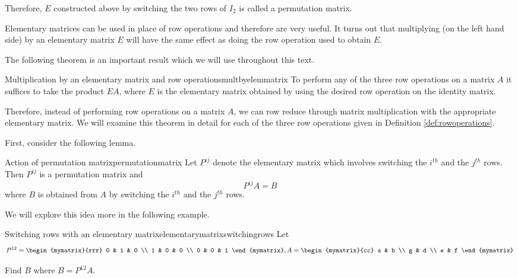 Therefore, $E$ constructed above by switching the two rows of $I_2$ is called a permutation matrix. 

Elementary matrices can be used in place of row operations and therefore are very useful. It turns
out that multiplying (on the left hand side) by an elementary matrix $E$ will have the
same effect as doing the row operation used to obtain $E$.

The following theorem is an important result which we will use throughout this text. 

\begin{theorem}{Multiplication by an elementary matrix and row operations}{multbyelemmatrix}
To perform any of the three row operations on a matrix $A$
it suffices to take the product $EA$, where $E$ is the elementary matrix obtained by 
using the desired row operation on the identity matrix.
\end{theorem}

Therefore, instead of performing row operations on a matrix $A$, we
can row reduce through matrix multiplication with the appropriate
elementary matrix. We will examine this theorem in detail for each of
the three row operations given in Definition \ref{def:rowoperations}.

First, consider the following lemma.

\begin{lemma}{Action of permutation matrix}{permutationmatrix}
Let $P^{ij}$ denote the elementary matrix which involves
switching the $i^{th}$ and the $j^{th}$ rows. Then $P^{ij}$ is a permutation matrix and 
\begin{equation*}
P^{ij}A=B
\end{equation*}
where $B$ is obtained from $A$ by switching the $i^{th}$ and the $j^{th}$
rows.
\end{lemma}

We will explore this idea more in the following example.

\begin{example}{Switching rows with an elementary matrix}{elementarymatrixswitchingrows}
Let
\begin{equation*}
P^{12} = \begin{mymatrix}{rrr}
0 & 1 & 0 \\
1 & 0 & 0 \\
0 & 0 & 1
\end{mymatrix}, A = \begin{mymatrix}{cc}
a & b \\
g & d \\
e & f
\end{mymatrix} 
\end{equation*}

Find $B$ where $B = P^{12}A$.
\end{example}

